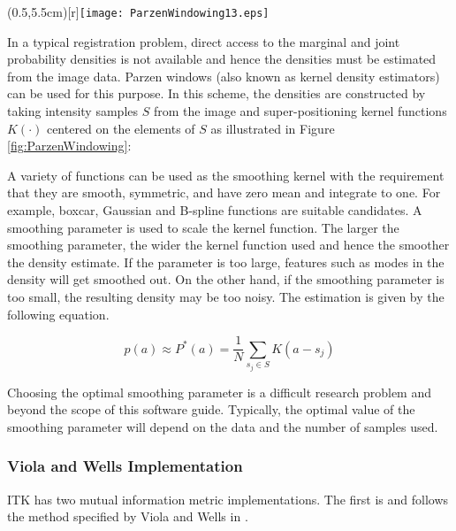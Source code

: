 \parpic(0.5\textwidth,5.5cm)[r]{\texttt{[image: ParzenWindowing13.eps]}}

In a typical registration problem, direct access to the marginal 
and joint probability densities is not available and hence the
densities must be estimated from the image data. Parzen windows 
(also known as kernel density estimators) can be used for this purpose.
In this scheme, the densities are constructed by taking intensity 
samples $S$ from the image and super-positioning kernel functions 
$K(\cdot)$ centered on the elements of $S$ as illustrated in
Figure \ref{fig:ParzenWindowing}:

A variety of functions can be used as the smoothing kernel with the
requirement that they are smooth, symmetric, and have zero mean and
integrate to one. For example, boxcar, Gaussian and B-spline functions are
suitable candidates.  A smoothing parameter is used to scale the kernel
function.  The larger the smoothing parameter, the wider the kernel function
used and hence the smoother the density estimate. If the parameter is too
large, features such as modes in the density will get smoothed out.  On the
other hand, if the smoothing parameter is too small, the resulting density
may be too noisy. The estimation is given by the following equation.

\begin{equation}
p(a) \approx P^{*}(a) = \frac{1}{N} \sum_{s_j \in S} K\left(a - s_j\right)
\end{equation}

Choosing the optimal smoothing parameter is a difficult research problem and
beyond the scope of this software guide.  Typically, the optimal value of the
smoothing parameter will depend on the data and the number of samples used.

\subsubsection{Viola and Wells Implementation}
ITK has two mutual information metric implementations. The first is 
 and follows the method specified
by Viola and Wells in \cite{Viola1997}.


